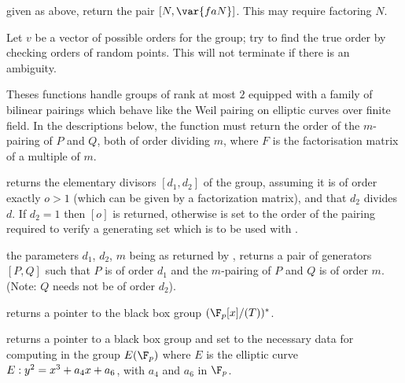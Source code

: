  given  as above,
return the pair $[N, \var{faN}]$. This may require factoring $N$.

Let $v$ be a vector of possible orders for the group; try to find the true
order by checking orders of random points. This will not terminate if there
is an ambiguity.


Theses functions handle groups of rank at most $2$ equipped with a family of
bilinear pairings which behave like the Weil pairing on elliptic curves over
finite field. In the descriptions below, the function  must return the order of the $m$-pairing of $P$ and $Q$, both of order
dividing $m$, where $F$ is the factorisation matrix of a multiple of $m$.

returns the elementary divisors $[d_1, d_2]$ of the group, assuming it is of
order exactly $o>1$ (which can be given by a factorization matrix), and that
$d_2$ divides $d$. If $d_2=1$ then $[o]$ is returned, otherwise
 is set to the order of the pairing required to verify a
generating set which is to be used with .

the parameters $d_1$, $d_2$, $m$ being as returned by ,
returns a pair of generators $[P,Q]$ such that $P$ is of order $d_1$ and the
$m$-pairing of $P$ and $Q$ is of order $m$. (Note: $Q$ needs not be of order
$d_2$).



returns a pointer to the black box group $(\F_p[x]/(T))^*$.

returns a pointer to a black box group and set  to the necessary data for
computing in the group $E(\F_p)$ where $E$ is the elliptic curve $E:y^2=x^3+a_4\*x+a_6$,
with $a_4$ and $a_6$ in $\F_p$.

